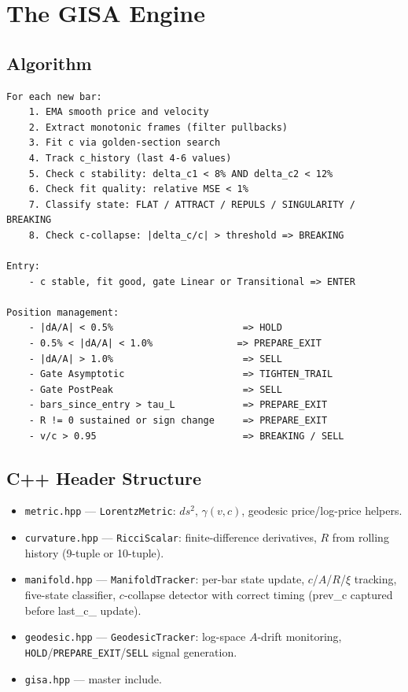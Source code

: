 \documentclass[12pt,a4paper]{article}
\begin{document}

\section{The GISA Engine}

\subsection{Algorithm}

\begin{lstlisting}[language={},basicstyle=\ttfamily\small,frame=single]
For each new bar:
    1. EMA smooth price and velocity
    2. Extract monotonic frames (filter pullbacks)
    3. Fit c via golden-section search
    4. Track c_history (last 4-6 values)
    5. Check c stability: delta_c1 < 8% AND delta_c2 < 12%
    6. Check fit quality: relative MSE < 1%
    7. Classify state: FLAT / ATTRACT / REPULS / SINGULARITY / BREAKING
    8. Check c-collapse: |delta_c/c| > threshold => BREAKING

Entry:
    - c stable, fit good, gate Linear or Transitional => ENTER

Position management:
    - |dA/A| < 0.5%                       => HOLD
    - 0.5% < |dA/A| < 1.0%               => PREPARE_EXIT
    - |dA/A| > 1.0%                       => SELL
    - Gate Asymptotic                     => TIGHTEN_TRAIL
    - Gate PostPeak                       => SELL
    - bars_since_entry > tau_L            => PREPARE_EXIT
    - R != 0 sustained or sign change     => PREPARE_EXIT
    - v/c > 0.95                          => BREAKING / SELL
\end{lstlisting}

\subsection{C++ Header Structure}

\begin{itemize}
    \item \texttt{metric.hpp} --- \texttt{LorentzMetric}: $ds^2$, $\gamma(v,c)$,
          geodesic price/log-price helpers.
    \item \texttt{curvature.hpp} --- \texttt{RicciScalar}: finite-difference
          derivatives, $R$ from rolling history (9-tuple or 10-tuple).
    \item \texttt{manifold.hpp} --- \texttt{ManifoldTracker}: per-bar state
          update, $c$/$A$/$R$/$\xi$ tracking, five-state classifier, $c$-collapse
          detector with correct timing (prev\_c captured before last\_c\_ update).
    \item \texttt{geodesic.hpp} --- \texttt{GeodesicTracker}: log-space $A$-drift
          monitoring, \texttt{HOLD}/\texttt{PREPARE\_EXIT}/\texttt{SELL} signal
          generation.
    \item \texttt{gisa.hpp} --- master include.
\end{itemize}
\end{document}
